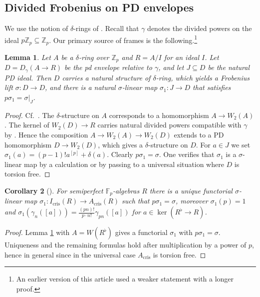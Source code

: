 \documentclass[a4paper,11pt]{article}
\theoremstyle{plain}
\newtheorem{Lemma}{Lemma}
\newtheorem{Cor}[Lemma]{Corollary}
\theoremstyle{definition}
\theoremstyle{remark}
\theoremstyle{definition}
\numberwithin{Lemma}{section}
\numberwithin{Subpoint}{Lemma}
\numberwithin{equation}{section}
\newcommand{\FF}{{\mathbb{F}}}
\newcommand{\ZZ}{{\mathbb{Z}}}
\DeclareMathOperator{\cris}{cris}
\newcommand{\chang}[1]{{#1}}
\begin{document}
\subsection*{\chang{Divided Frobenius on PD envelopes}}

\chang{We use the notion of $\delta$-rings of \cite{Bhatt-Scholze:Prisms}. Recall that $\gamma$ denotes the divided powers on the ideal $p\ZZ_p\subseteq\ZZ_p$. Our primary source of frames is the following.\footnote{An earlier version of this article used a weaker statement with a longer proof.}

\begin{Lemma}
\label{Le:delta-pd-sigma1}
Let $A$ be a $\delta$-ring over $\ZZ_p$ and $R=A/I$ for an ideal $I$. Let $D=D_{\gamma}(A\to R)$ be the pd envelope relative to $\gamma$, and let $J\subseteq D$ be the natural PD ideal. Then $D$ carries a natural structure of $\delta$-ring, which yields a Frobenius lift $\sigma:D\to D$, and there is a natural $\sigma$-linear map $\sigma_1:J\to D$ that satisfies $p\sigma_1=\sigma|_J$.
\end{Lemma}

\begin{proof}
Cf.\ \cite[Remark 4.12]{Hoff-Lau:Sheared}. 
The $\delta$-structure on $A$ corresponds to a homomorphism $A\to W_2(A)$.
 The kernel of $W_2(D)\to R$ carries natural divided powers compatible with $\gamma$ by \cite[\S2.3]{Zink:Display}.
Hence the composition $A\to W_2(A)\to W_2(D)$ extends to a PD homomorphism $D\to W_2(D)$, which gives a $\delta$-structure on $D$. For $a\in J$ we set $\sigma_1(a)=(p-1)!a^{[p]}+\delta(a)$. Clearly $p\sigma_1=\sigma$. One verifies that $\sigma_1$ is a $\sigma$-linear map by a calculation or by passing to a universal situation where $D$ is torsion free. 
\end{proof}

\begin{Cor}[{\cite[Lemma 4.1.8]{Scholze-Weinstein}}]
\label{Co:SW}
For semiperfect $\FF_p$-algebras $R$ there is a unique functorial $\sigma$-linear map $\sigma_1:I_{\cris}(R)\to A_{\cris}(R)$ such that $p\sigma_1=\sigma$, moreover $\sigma_1(p)=1$ and $\sigma_1(\gamma_n([a]))=\frac{(pn)!}{p\cdot n!}\gamma_{pn}([a])$ for $a\in\ker(R^\flat\to R)$.
\end{Cor}

\begin{proof}
Lemma \ref{Le:delta-pd-sigma1} with $A=W(R^\flat)$ gives a functorial $\sigma_1$ with $p\sigma_1=\sigma$. Uniqueness and the remaining formulas hold after multiplication by a power of $p$, hence in general since in the universal case $A_{\cris}$ is torsion free.
\end{proof}
}
\end{document}
